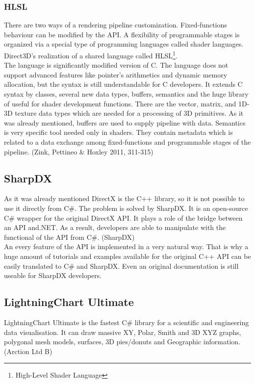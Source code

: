 \documentclass[twoside, english, 11pt]{report}
\begin{document}
\subsubsection{HLSL}
There are two ways of a rendering pipeline customization. Fixed-functions behaviour can be modified by the API. A flexibility of programmable stages is organized via a special type of programming languages called shader languages. Direct3D's realization of a shared language called HLSL\footnote{High-Level Shader Language}.\\

The language is significantly modified version of C. The language does not support advanced features like pointer's arithmetics and dynamic memory allocation, but the syntax is still understandable for C developers. It extends C syntax by classes, several new data types, buffers, semantics and the huge library of useful for shader development functions. There are the vector, matrix, and 1D-3D texture data types which are needed for a processing of 3D primitives. As it was already mentioned, buffers are used to supply pipeline with data. Semantics is very specific tool needed only in shaders. They contain metadata which is related to a data exchange among fixed-functions and programmable stages of the pipeline. (Zink, Pettineo \& Hoxley 2011, 311-315)
\subsection{SharpDX}

As it was already mentioned DirectX is the C++ library, so it is not possible to use it directly from C\#. The problem is solved by SharpDX. It is an open-source C\# wrapper for the original DirectX API. It plays a role of the bridge between an API and.NET. As a result, developers are able to manipulate with the functional of the API from C\#. (SharpDX)\\

An every feature of the API is implemented in a very natural way. That is why a huge amount of tutorials and examples available for the original C++ API can be easily translated to C\# and SharpDX. Even an original documentation is still useable for SharpDX developers.

\subsection{LightningChart Ultimate}

LightningChart Ultimate is the fastest C\# library for a scientific and engineering data visualisation. It can draw massive XY, Polar, Smith and 3D XYZ graphs, polygonal mesh models, surfaces, 3D pies/donuts and Geographic information. (Arction Ltd B)
\end{document}
